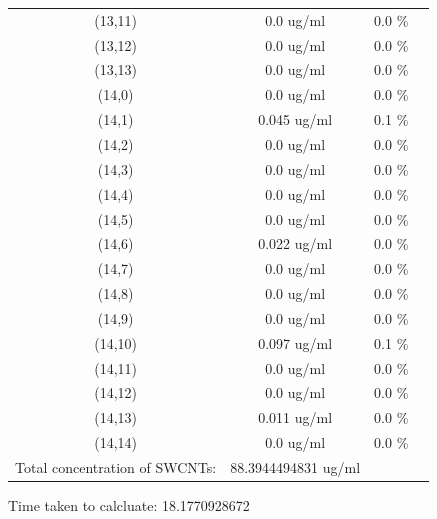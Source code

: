 \documentclass{article}
\begin{document}
\begin{tabular}{c c c c}
(13,11)&        0.0 ug/ml        &0.0 \%\\
(13,12)&        0.0 ug/ml        &0.0 \%\\
(13,13)&        0.0 ug/ml        &0.0 \%\\
(14,0)&        0.0 ug/ml        &0.0 \%\\
(14,1)&        0.045 ug/ml        &0.1 \%\\
(14,2)&        0.0 ug/ml        &0.0 \%\\
(14,3)&        0.0 ug/ml        &0.0 \%\\
(14,4)&        0.0 ug/ml        &0.0 \%\\
(14,5)&        0.0 ug/ml        &0.0 \%\\
(14,6)&        0.022 ug/ml        &0.0 \%\\
(14,7)&        0.0 ug/ml        &0.0 \%\\
(14,8)&        0.0 ug/ml        &0.0 \%\\
(14,9)&        0.0 ug/ml        &0.0 \%\\
(14,10)&        0.097 ug/ml        &0.1 \%\\
(14,11)&        0.0 ug/ml        &0.0 \%\\
(14,12)&        0.0 ug/ml        &0.0 \%\\
(14,13)&        0.011 ug/ml        &0.0 \%\\
(14,14)&        0.0 ug/ml        &0.0 \%\\
Total concentration of SWCNTs: &88.3944494831 ug/ml\\

\end{tabular}Time taken to calcluate: 18.1770928672
\end{document}
